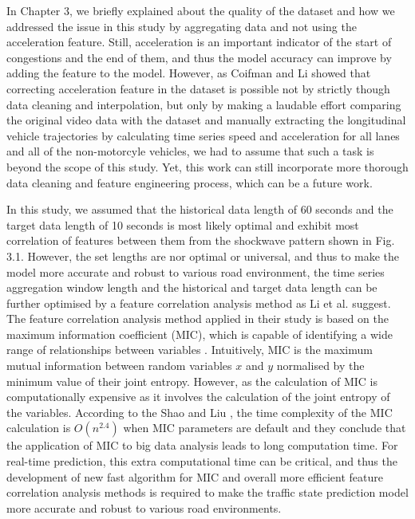 \documentclass[11pt]{uonthesis}
\begin{document}
In Chapter 3, we briefly explained about the quality of the dataset and how we addressed the issue in this study by aggregating data and not using the acceleration feature. Still, acceleration is an important indicator of the start of congestions and the end of them, and thus the model accuracy can improve by adding the feature to the model. However, as Coifman and Li \cite{COIFMAN2017362} showed that correcting acceleration feature in the dataset is possible not by strictly though data cleaning and interpolation, but only by making a laudable effort comparing the original video data with the dataset and manually extracting the longitudinal vehicle trajectories by calculating time series speed and acceleration for all lanes and all of the non-motorcyle vehicles, we had to assume that such a task is beyond the scope of this study. Yet, this work can still incorporate more thorough data cleaning and feature engineering process, which can be a future work.

In this study, we assumed that the historical data length of 60 seconds and the target data length of 10 seconds is most likely optimal and exhibit most correlation of features between them from the shockwave pattern shown in Fig. 3.1. %
However, the set lengths are nor optimal or universal, and thus to make the model more accurate and robust to various road environment, the time series aggregation window length and the historical and target data length can be further optimised by a feature correlation analysis method as Li et al. \cite{9284587} suggest. The feature correlation analysis method applied in their study is based on the maximum information coefficient (MIC), which is capable of identifying a wide range of relationships between variables \cite{mic}. %
Intuitively, MIC is the maximum mutual information between random variables $x$ and $y$ normalised by the minimum value of their joint entropy. However, as the calculation of MIC is computationally expensive as it involves the calculation of the joint entropy of the variables. According to the Shao and Liu \cite{miccomplexity}, the time complexity of the MIC calculation is $O(n^{2.4})$ when MIC parameters are default and they conclude that the application of MIC to big data analysis leads to long computation time. For real-time prediction, this extra computational time can be critical, and thus the development of new fast algorithm for MIC and overall more efficient feature correlation analysis methods is required to make the traffic state prediction model more accurate and robust to various road environments.
\end{document}
